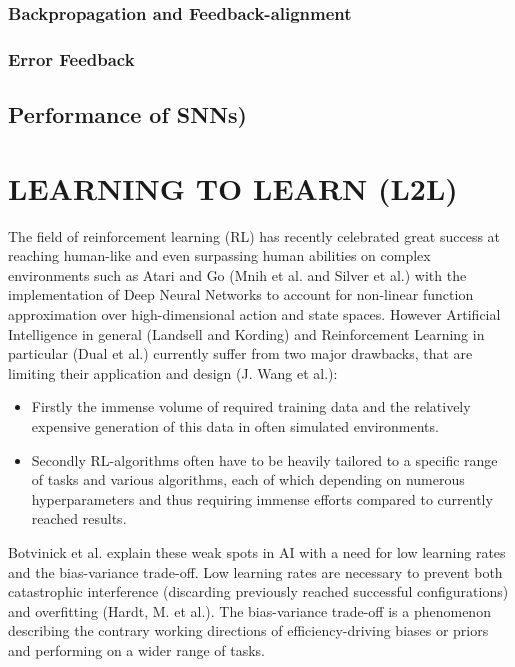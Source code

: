 \documentclass[letterpaper, 10 pt, conference]{ieeeconf}  %
\begin{document}
\subsubsection{Backpropagation and Feedback-alignment}


\subsubsection{Error Feedback}

\subsection{Performance of SNNs)}

\section{LEARNING TO LEARN (L2L)}

The field of reinforcement learning (RL) has recently celebrated great success at reaching human-like and even surpassing human abilities on
complex environments such as Atari and Go (Mnih et al. and Silver et al.) with the implementation of Deep Neural Networks to 
account for non-linear function approximation over high-dimensional action and state spaces. However Artificial Intelligence in general 
(Landsell and Kording) and Reinforcement Learning in particular (Dual et al.) currently suffer from two major drawbacks, 
that are limiting their application and design (J. Wang et al.): 
\begin{itemize}
        \item Firstly the immense volume of required training data and the relatively expensive generation of this data in often simulated
        environments.
        \item Secondly RL-algorithms often have to be heavily tailored to a specific range of tasks and various algorithms, each of which
        depending on numerous hyperparameters and thus requiring immense efforts compared to currently reached results.
\end{itemize}        

Botvinick et al. explain these weak spots in AI with a need for low learning rates and the bias-variance trade-off.
Low learning rates are necessary to prevent both catastrophic interference (discarding previously reached successful
configurations) and overfitting (Hardt, M. et al.). The bias-variance trade-off is a phenomenon describing the contrary 
working directions of efficiency-driving biases or priors and performing on a wider range of tasks. \newline
\end{document}
